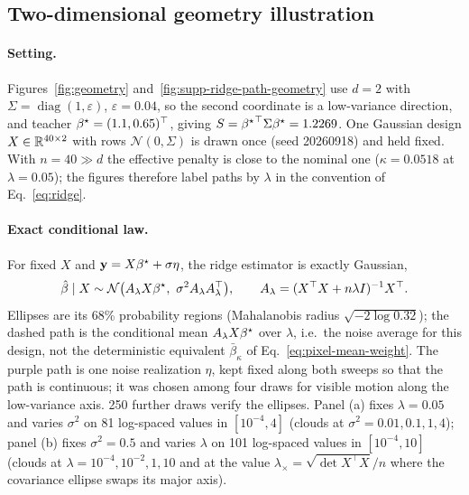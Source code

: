 \subsection{Two-dimensional geometry illustration}
\label{sec:app-methods-geometry}
\paragraph{Setting.}
Figures~\ref{fig:geometry} and~\ref{fig:supp-ridge-path-geometry} use $d=2$
with $\Sigma=\operatorname{diag}(1,\varepsilon)$, $\varepsilon=0.04$, so the
second coordinate is a low-variance direction, and teacher
${\beta^{\star}}=(1.1,0.65)^\top$, giving $S={{\beta^{\star}}}^\top\Sigma{\beta^{\star}}=1.2269$.  One
Gaussian design $X\in\mathbb{R}^{40\times2}$ with rows $\mathcal N(0,\Sigma)$ is drawn
once (seed 20260918) and held fixed.  With $n=40\gg d$ the effective penalty
is close to the nominal one ($\kappa=0.0518$ at $\lambda=0.05$); the figures
therefore label paths by $\lambda$ in the convention of Eq.~\ref{eq:ridge}.

\paragraph{Exact conditional law.}
For fixed $X$ and $\mathbf y=X{\beta^{\star}}+\sigma\eta$, the ridge estimator is exactly
Gaussian,
\[
\bhat\mid X\sim\mathcal N\big(A_\lambda X\bstar,\ \sigma^2A_\lambda A_\lambda^\top\big),
\qquad A_\lambda=(X^\top X+n\lambda I)^{-1}X^\top .
\]
Ellipses are its 68\% probability regions (Mahalanobis radius
$\sqrt{-2\log0.32}$); the dashed path is the conditional mean $A_\lambda X{\beta^{\star}}$
over $\lambda$, i.e.\ the noise average for this design, not the
deterministic equivalent $\bar\beta_\kappa$ of Eq.~\ref{eq:pixel-mean-weight}.
The purple path is one noise realization $\eta$, kept fixed along both sweeps
so that the path is continuous; it was chosen among four draws for visible
motion along the low-variance axis.  250 further draws verify the ellipses.
Panel (a) fixes $\lambda=0.05$ and varies $\sigma^2$ on 81 log-spaced values in
$[10^{-4},4]$ (clouds at $\sigma^2=0.01,0.1,1,4$); panel (b) fixes
$\sigma^2=0.5$ and varies $\lambda$ on 101 log-spaced values in
$[10^{-4},10]$ (clouds at $\lambda=10^{-4},10^{-2},1,10$ and at the value
$\lambda_\times=\sqrt{\det X^\top X}/n$ where the covariance ellipse swaps its
major axis).

